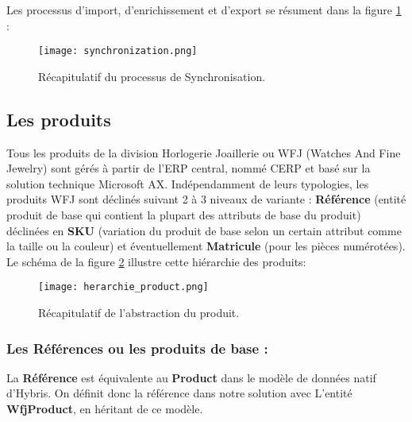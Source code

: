 Les processus d'import, d'enrichissement et d'export se résument dans la figure \ref{fig:synchronisation} :
\begin{figure}[ht]
  \centering
  \texttt{[image: synchronization.png]}
  \caption{Récapitulatif du processus de Synchronisation.}
  \label{fig:synchronisation}
\end{figure}
\FloatBarrier
\subsection{Les produits}

Tous les produits de la division Horlogerie Joaillerie ou WFJ (Watches And Fine Jewelry) sont gérés à partir de l'ERP central, nommé CERP et basé sur la solution technique Microsoft AX. Indépendamment de leurs typologies, les produits WFJ sont déclinés suivant 2 à 3 niveaux de variante : \textbf{Référence} (entité produit de base qui contient la plupart des attributs de base du produit) déclinées en \textbf{SKU} (variation du produit de base selon un certain attribut comme la taille ou la couleur) et éventuellement \textbf{Matricule} (pour les pièces numérotées).\\

Le schéma de la figure \ref{fig:herarchie_product} illustre cette hiérarchie des produits:

\begin{figure}[ht]
  \centering
  \texttt{[image: herarchie\_product.png]}
  \caption{Récapitulatif de l'abstraction du produit.}
  \label{fig:herarchie_product}
\end{figure}
\FloatBarrier


\subsubsection{Les Références ou les produits de base :}

La \textbf{Référence} est équivalente au \textbf{Product} dans le modèle de données natif d'Hybris. On définit donc la référence dans notre solution avec L'entité \textbf{WfjProduct}, en héritant de ce modèle.
\medskip

